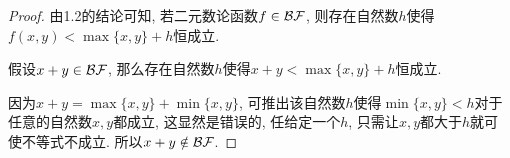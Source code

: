 \begin{proof}
由1.2的结论可知, 若二元数论函数$f\in\mathcal{BF}$, 则存在自然数$h$使得$f(x,y)<\max\{x,y\}+h$恒成立.

假设$x+y\in\mathcal{BF}$, 那么存在自然数$h$使得$x+y<\max\{x,y\}+h$恒成立. 

因为$x+y=\max\{x,y\}+\min\{x,y\}$, 可推出该自然数$h$使得$\min\{x,y\}<h$对于任意的自然数$x,y$都成立, 这显然是错误的, 任给定一个$h$, 只需让$x,y$都大于$h$就可使不等式不成立. 所以$x+y\notin\mathcal{BF}$.
\end{proof}